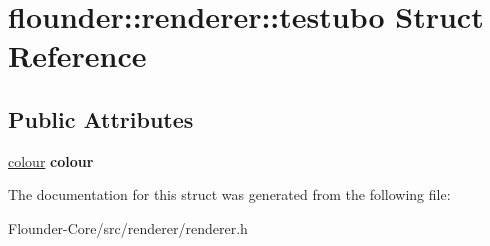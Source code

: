 \hypertarget{structflounder_1_1renderer_1_1testubo}{}\section{flounder\+:\+:renderer\+:\+:testubo Struct Reference}
\label{structflounder_1_1renderer_1_1testubo}
\subsection*{Public Attributes}
\begin{DoxyCompactItemize}
\item 
\mbox{\label{structflounder_1_1renderer_1_1testubo_a7f6bbd26c5b9115e380d2b18b3e9eff0}} 
\hyperlink{classflounder_1_1colour}{colour} {\bfseries colour}
\end{DoxyCompactItemize}


The documentation for this struct was generated from the following file\+:\begin{DoxyCompactItemize}
\item 
Flounder-\/\+Core/src/renderer/renderer.\+h\end{DoxyCompactItemize}
